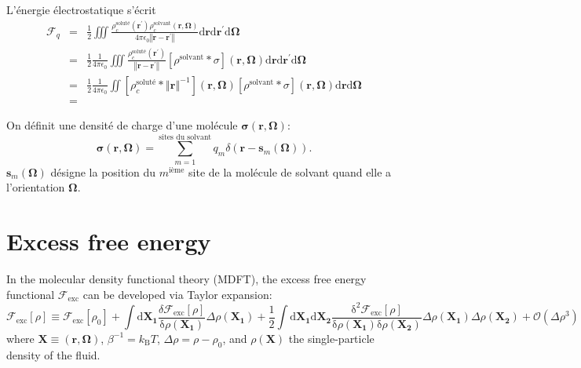 L'énergie électrostatique s'écrit
\begin{eqnarray}
\mathcal{F}_{q} & = & \frac{1}{2}\iiint\frac{\rho_{c}^{\textrm{soluté}}\left(\boldsymbol{r^{\prime}}\right)\rho_{c}^{\textrm{solvant}}\left(\boldsymbol{r},\boldsymbol{\Omega}\right)}{4\pi\epsilon_{0}\left\Vert \boldsymbol{r}-\boldsymbol{r^{\prime}}\right\Vert }\textrm{d}\boldsymbol{r}\textrm{d}\boldsymbol{r^{\prime}}\textrm{d}\boldsymbol{\Omega}\\
 & = & \frac{1}{2}\frac{1}{4\pi\epsilon_{0}}\iiint\frac{\rho_{c}^{\textrm{soluté}}\left(\boldsymbol{r^{\prime}}\right)}{\left\Vert \boldsymbol{r}-\boldsymbol{r^{\prime}}\right\Vert }\left[\rho^{\textrm{solvant}}*\sigma\right]\left(\boldsymbol{r},\boldsymbol{\Omega}\right)\textrm{d}\boldsymbol{r}\textrm{d}\boldsymbol{r^{\prime}}\textrm{d}\boldsymbol{\Omega}\\
 & = & \frac{1}{2}\frac{1}{4\pi\epsilon_{0}}\iint\left[\rho_{c}^{\textrm{soluté}}*\left\Vert \boldsymbol{r}\right\Vert ^{-1}\right]\left(\boldsymbol{r},\boldsymbol{\Omega}\right)\left[\rho^{\textrm{solvant}}*\sigma\right]\left(\boldsymbol{r},\boldsymbol{\Omega}\right)\textrm{d}\boldsymbol{r}\textrm{d}\boldsymbol{\Omega}\\
 & =
\end{eqnarray}


On définit une densité de charge d'une molécule $\boldsymbol{\sigma}\left(\boldsymbol{r},\boldsymbol{\Omega}\right)$:
\begin{equation}
\boldsymbol{\sigma}\left(\boldsymbol{r},\boldsymbol{\Omega}\right)=\sum_{m=1}^{\textrm{sites du solvant}}q_{m}\delta\left(\boldsymbol{r}-\boldsymbol{s}_{m}\left(\boldsymbol{\Omega}\right)\right).
\end{equation}
$\boldsymbol{s}_{m}\left(\boldsymbol{\Omega}\right)$ désigne la position
du $m^{\textrm{ième}}$ site de la molécule de solvant quand elle
a l'orientation $\boldsymbol{\Omega}$.


\section{Excess free energy}

In the molecular density functional theory (MDFT), the excess free
energy functional $\mathcal{F}_{\mathrm{exc}}$ can be developed via
Taylor expansion: 
\begin{equation}
\mathcal{F}_{\mathrm{exc}}\left[\rho\right]\equiv\mathcal{F}_{\mathrm{exc}}\left[\rho_{0}\right]+\int\mathrm{d}\mathbf{X_{1}}\frac{\delta\mathcal{F}_{\mathrm{exc}}\left[\rho\right]}{\mathrm{\delta}\rho(\mathbf{X_{1}})}\Delta\rho(\mathbf{X_{1}})+\frac{1}{2}\int\mathrm{d}\mathbf{X_{1}}\mathrm{d}\mathbf{X_{2}}\frac{\mathrm{\delta}^{2}\mathcal{F}_{\mathrm{exc}}\left[\rho\right]}{\mathrm{\delta}\rho(\mathbf{X_{1}})\mathrm{\delta}\rho(\mathbf{X_{2}})}\Delta\rho(\mathbf{X_{1}})\Delta\rho(\mathbf{X_{2}})+\mathcal{O}(\Delta\rho^{3})\label{eq:Taylor-1}
\end{equation}
where $\mathbf{X}\equiv(\mathbf{r},\mathbf{\Omega})$, $\beta^{-1}=k_{\mathrm{B}}T$,
$\Delta\rho=\rho-\rho_{0}$, and $\rho(\mathbf{X})$ the single-particle
density of the fluid.


